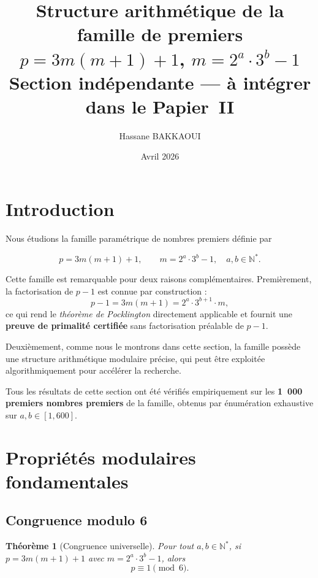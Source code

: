 \documentclass[12pt,a4paper]{article}
\title{%
  \textbf{Structure arithmétique de la famille de premiers}\\[6pt]
  $p = 3m(m+1)+1$, \quad $m = 2^a \cdot 3^b - 1$\\[10pt]
  \large Section indépendante — à intégrer dans le Papier~II
}
\author{Hassane BAKKAOUI}
\date{Avril 2026}
\newtheorem{theoreme}{Théorème}
\theoremstyle{definition}
\newcommand{\N}{\mathbb{N}}
\begin{document}
\maketitle
\tableofcontents
\newpage

\section{Introduction}

Nous étudions la famille paramétrique de nombres premiers définie par

\begin{equation}\label{eq:famille}
  p = 3m(m+1)+1, \qquad m = 2^a \cdot 3^b - 1,
  \quad a, b \in \N^*.
\end{equation}

Cette famille est remarquable pour deux raisons complémentaires.
Premièrement, la factorisation de $p-1$ est connue par construction :
\[
  p - 1 = 3m(m+1) = 2^a \cdot 3^{b+1} \cdot m,
\]
ce qui rend le \emph{théorème de Pocklington} directement applicable
et fournit une \textbf{preuve de primalité certifiée} sans factorisation
préalable de $p-1$.

Deuxièmement, comme nous le montrons dans cette section,
la famille possède une structure arithmétique modulaire précise,
qui peut être exploitée algorithmiquement pour accélérer la recherche.

Tous les résultats de cette section ont été vérifiés empiriquement
sur les \textbf{1~000 premiers nombres premiers} de la famille,
obtenus par énumération exhaustive sur $a, b \in [1, 600]$.

\section{Propriétés modulaires fondamentales}

\subsection{Congruence modulo 6}

\begin{theoreme}[Congruence universelle]\label{thm:mod6}
  Pour tout $a, b \in \N^*$, si $p = 3m(m+1)+1$ avec $m = 2^a \cdot 3^b - 1$,
  alors
  \[
    p \equiv 1 \pmod{6}.
  \]
\end{theoreme}
\end{document}
